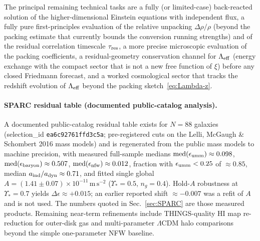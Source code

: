 \documentclass[11pt,a4paper]{article}
\begin{document}
The principal remaining technical tasks are a fully (or limited-case) back-reacted solution of the higher-dimensional Einstein equations with independent flux, a fully pure first-principles evaluation of the relative unpacking \(\Delta\rho/\rho\) (beyond the packing estimate that currently bounds the conversion running strengths) and of the residual correlation timescale \(\tau_{\rm res}\), a more precise microscopic evaluation of the packing coefficients, a residual-geometry conservation channel for \(\Lambda_{\rm eff}\) (energy exchange with the compact sector that is not a new free function of \(\xi\)) before any closed Friedmann forecast, and a worked cosmological sector that tracks the redshift evolution of \(\Lambda_{\rm eff}\) beyond the packing sketch~\eqref{eq:Lambda-z}.

\paragraph{SPARC residual table (documented public-catalog analysis).}
A documented public-catalog residual table exists for \(N=88\) galaxies (selection\_id \texttt{ea6c92761ffd3c5a}; pre-registered cuts on the Lelli, McGaugh \& Schombert 2016 mass models) and is regenerated from the public mass models to machine precision, with measured full-sample medians \(\mathrm{med}(\epsilon_{\rm umm})\approx 0.098\), \(\mathrm{med}(\epsilon_{\rm baryon})\approx 0.507\), \(\mathrm{med}(\epsilon_{\rm nfw})\approx 0.012\), fraction with \(\epsilon_{\rm umm}<0.25\) of \(\approx 0.85\), median \(a_{\rm ind}/a_{\rm dyn}\approx 0.71\), and fitted single global \(A=(1.41\pm 0.07)\times 10^{-11}\,\mathrm{m\,s^{-2}}\) (\(\Upsilon_*=0.5\), \(n_g=0.4\)). Hold-\(A\) robustness at \(\Upsilon_*=0.7\) yields \(\Delta\epsilon\approx +0.015\); an earlier reported shift \(\approx -0.007\) was a refit of \(A\) and is not used. The numbers quoted in Sec.~\ref{sec:SPARC} are those measured products. Remaining near-term refinements include THINGS-quality HI map re-reduction for outer-disk gas \cite{Walter2008} and multi-parameter \(\Lambda\)CDM halo comparisons beyond the simple one-parameter NFW baseline.
\end{document}
